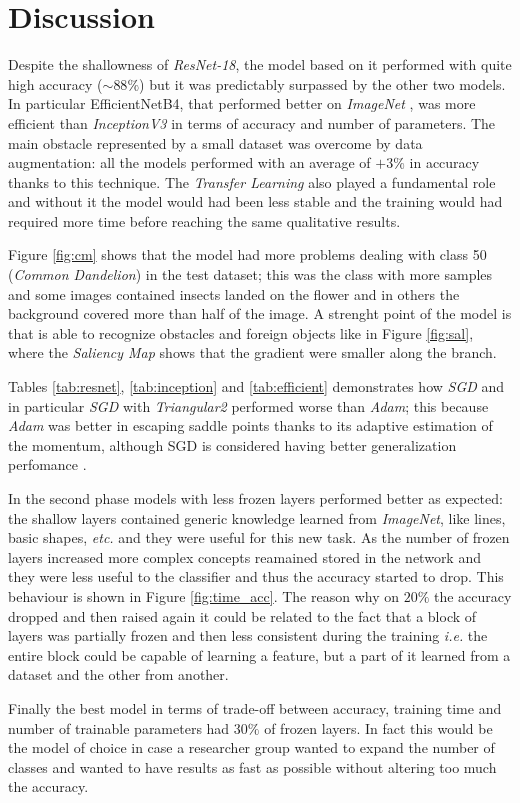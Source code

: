 \section{Discussion}
Despite the shallowness of \textit{ResNet-18}, the model based on it performed with quite high accuracy ($\sim 88\%$) but it was predictably surpassed by the other two models. In particular EfficientNetB4, that performed better on \textit{ImageNet} \cite{tan2019efficientnet}, was more efficient than \textit{InceptionV3} in terms of accuracy and number of parameters. The main obstacle represented by a small dataset was overcome by data augmentation: all the models performed with an average of $+3\%$ in accuracy thanks to this technique. The \textit{Transfer Learning} also played a fundamental role and  without it the model would had been less stable and the training would had required more time before reaching the same qualitative results.\par
Figure \ref{fig:cm} shows that the model had more problems dealing with class 50 (\textit{Common Dandelion}) in the test dataset; this was the class with more samples and some images contained insects landed on the flower and in others the background covered more than half of the image. A strenght point of the model is that is able to recognize obstacles and foreign objects like in Figure \ref{fig:sal}, where the \textit{Saliency Map} shows that the gradient were smaller along the branch.
\par
Tables \ref{tab:resnet}, \ref{tab:inception} and \ref{tab:efficient} demonstrates how \textit{SGD} and in particular \textit{SGD} with \textit{Triangular2} performed worse than \textit{Adam}; this because \textit{Adam} was better in escaping saddle points thanks to its adaptive estimation of the momentum, although SGD is considered having better generalization perfomance \cite{Ashia}.\par
In the second phase models with less frozen layers performed better as expected: the shallow layers contained generic knowledge learned from \textit{ImageNet}, like lines, basic shapes, \textit{etc.} and they were useful for this new task. As the number of frozen layers increased more complex concepts reamained stored in the network and they were less useful to the classifier
and thus the accuracy started to drop. This behaviour is shown in Figure \ref{fig:time_acc}. The reason why on $20\%$ the accuracy dropped and then raised again it could be related to the fact that a block of layers was partially frozen and then less consistent during the training \textit{i.e.} the entire block could be capable of learning a feature, but a part of it learned from a dataset and the other from another.
\par Finally the best model in terms of trade-off between accuracy, training time and number of trainable parameters had $30\%$ of frozen layers. In fact this would be the model of choice in case a researcher group wanted to expand the number of classes and wanted to have results as fast as possible without altering too much the accuracy.\par


